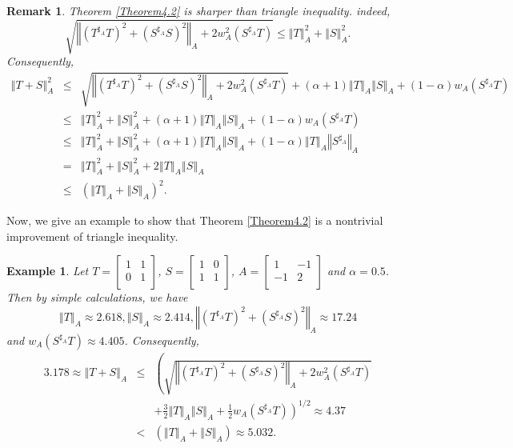 \documentclass{article}
\newcommand{\bra}[1]{\left(#1\right)}
\newcommand{\normA}[1]{{\left\Vert#1\right\Vert}_{A}}
\newcommand {\Sa}{S^{\sharp_{A}}}
\newcommand {\Ta}{T^{\sharp_{A}}}
\newtheorem{example}[theorem]{Example}
\newtheorem{remark}[theorem]{Remark}
\begin{document}
\begin{remark} Theorem \ref{Theorem4.2} is sharper than triangle inequality. indeed,
$$\sqrt{\normA{(\Ta T)^2+(\Sa S)^2}+2w_A^2(\Sa T)}\leq \normA{T}^2+\normA{S}^2.$$
Consequently,
\begin{eqnarray*}
 \normA{T+S}^2&\leq&\sqrt{\normA{(\Ta T)^2+(\Sa S)^2}+2w_A^2(\Sa T)}+(\alpha+1)\normA{T}\normA{S}+(1-\alpha)w_A(\Sa T)\\
 &\leq& \normA{T}^2+\normA{S}^2+(\alpha+1)\normA{T}\normA{S}+(1-\alpha)w_A(\Sa T)\\
 &\leq& \normA{T}^2+\normA{S}^2+(\alpha+1)\normA{T}\normA{S}+(1-\alpha)\normA{T}\normA{\Sa}\\
 &=& \normA{T}^2+\normA{S}^2+2\normA{T}\normA{S}\\
 &\leq&\bra{\normA{T}+\normA{S}}^2.
\end{eqnarray*}
\end{remark}
Now, we give an example to show that Theorem \ref{Theorem4.2} is a nontrivial improvement of
triangle inequality.
\begin{example} Let $T=\begin{bmatrix} 1& 1 \\ 0 & 1 \\ \end{bmatrix}$, $S=\begin{bmatrix} 1& 0 \\ 1& 1 \\ \end{bmatrix}$,
$A=\begin{bmatrix} 1& -1 \\ -1 & 2 \\ \end{bmatrix}$ and $\alpha=0.5$. Then by simple calculations, we
have
$$\normA{T}\approx 2.618, \normA{S}\approx2.414, \normA{(\Ta T)^2+(\Sa S)^2}\approx  17.24$$
and $w_A(\Sa T)\approx4.405$. Consequently,
\begin{eqnarray*}
   3.178\approx \normA{T+S} &\leq& \left(\sqrt{\normA{(\Ta T)^2+(\Sa S)^2}+2w_A^2(\Sa T)}\right.\\
   &&\left.+\frac{3}{2}\normA{T}\normA{S}+\frac{1}{2}w_A(\Sa T)\right)^{1/2}\approx 4.37\\
   &<&\bra{\normA{T}+\normA{S}}\approx 5.032.
\end{eqnarray*}
\end{example}
\end{document}
